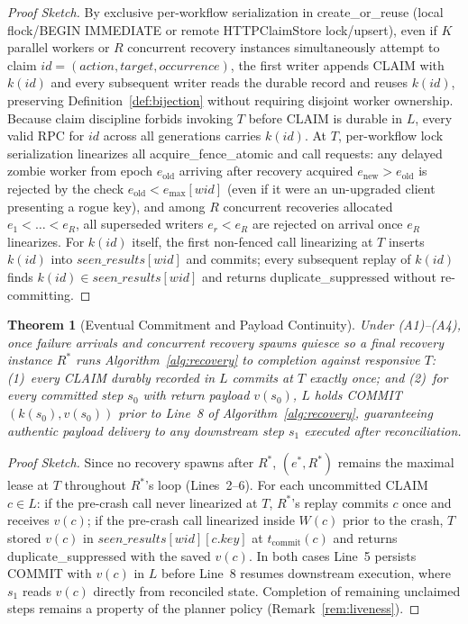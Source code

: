 \documentclass[10pt,journal]{IEEEtran}
\def\texttt#1{#1}%
\newtheorem{theorem}{Theorem}
\theoremstyle{definition}
\theoremstyle{remark}
\begin{document}
\begin{proof}[Proof Sketch]
By exclusive per-workflow serialization in \texttt{create\_or\_reuse} (local \texttt{flock}/\texttt{BEGIN IMMEDIATE} or remote \texttt{HTTPClaimStore} lock/upsert), even if $K$ parallel workers or $R$ concurrent recovery instances simultaneously attempt to claim $id = (\mathit{action}, \mathit{target}, \mathit{occurrence})$, the first writer appends \texttt{CLAIM} with $k(id)$ and every subsequent writer reads the durable record and reuses $k(id)$, preserving Definition~\ref{def:bijection} without requiring disjoint worker ownership. Because claim discipline forbids invoking $T$ before \texttt{CLAIM} is durable in $L$, every valid RPC for $id$ across all generations carries $k(id)$. At $T$, per-workflow lock serialization linearizes all \texttt{acquire\_fence\_atomic} and \texttt{call} requests: any delayed zombie worker from epoch $e_{\mathrm{old}}$ arriving after recovery acquired $e_{\mathrm{new}} > e_{\mathrm{old}}$ is rejected by the check $e_{\mathrm{old}} < e_{\max}[\mathit{wid}]$ (even if it were an un-upgraded client presenting a rogue key), and among $R$ concurrent recoveries allocated $e_1 < \dots < e_R$, all superseded writers $e_r < e_R$ are rejected on arrival once $e_R$ linearizes. For $k(id)$ itself, the first non-fenced \texttt{call} linearizing at $T$ inserts $k(id)$ into $\mathit{seen\_results}[\mathit{wid}]$ and commits; every subsequent replay of $k(id)$ finds $k(id) \in \mathit{seen\_results}[\mathit{wid}]$ and returns \texttt{duplicate\_suppressed} without re-committing.
\end{proof}

\begin{theorem}[Eventual Commitment and Payload Continuity]\label{thm:liveness}
Under (A1)--(A4), once failure arrivals and concurrent recovery spawns quiesce so a final recovery instance $R^*$ runs Algorithm~\ref{alg:recovery} to completion against responsive $T$: (1)~every \texttt{CLAIM} durably recorded in $L$ commits at $T$ exactly once; and (2)~for every committed step $s_0$ with return payload $v(s_0)$, $L$ holds \texttt{COMMIT}$(k(s_0), v(s_0))$ prior to Line~8 of Algorithm~\ref{alg:recovery}, guaranteeing authentic payload delivery to any downstream step $s_1$ executed after reconciliation.
\end{theorem}

\begin{proof}[Proof Sketch]
Since no recovery spawns after $R^*$, $(e^*, R^*)$ remains the maximal lease at $T$ throughout $R^*$'s loop (Lines~2--6). For each uncommitted \texttt{CLAIM} $c \in L$: if the pre-crash call never linearized at $T$, $R^*$'s replay commits $c$ once and receives $v(c)$; if the pre-crash call linearized inside $W(c)$ prior to the crash, $T$ stored $v(c)$ in $\mathit{seen\_results}[\mathit{wid}][c.\mathit{key}]$ at $t_{\mathrm{commit}}(c)$ and returns \texttt{duplicate\_suppressed} with the saved $v(c)$. In both cases Line~5 persists \texttt{COMMIT} with $v(c)$ in $L$ before Line~8 resumes downstream execution, where $s_1$ reads $v(c)$ directly from reconciled state. Completion of remaining unclaimed steps remains a property of the planner policy (Remark~\ref{rem:liveness}).
\end{proof}
\end{document}
